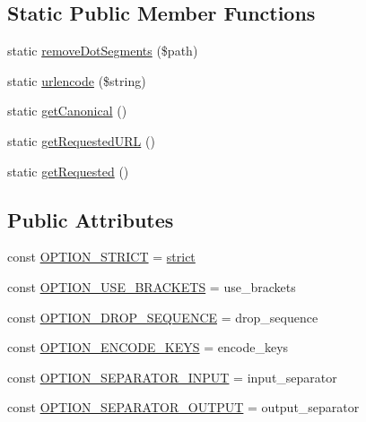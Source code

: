 \subsection*{Static Public Member Functions}
\begin{DoxyCompactItemize}
\item 
static \hyperlink{classNet__URL2_aa2ca379f950f6e7a3932121ad39c0e5a}{remove\+Dot\+Segments} (\$path)
\item 
static \hyperlink{classNet__URL2_ab870de85228bfe185ce8a208c0438c43}{urlencode} (\$string)
\item 
static \hyperlink{classNet__URL2_ae11b6a2c904b4d60e63d75a1bfe508a9}{get\+Canonical} ()
\item 
static \hyperlink{classNet__URL2_acc74a73bb075b3a500ded81b63799d59}{get\+Requested\+U\+RL} ()
\item 
static \hyperlink{classNet__URL2_a57c171f9507f78aafbaba695f1220273}{get\+Requested} ()
\end{DoxyCompactItemize}
\subsection*{Public Attributes}
\begin{DoxyCompactItemize}
\item 
const \hyperlink{classNet__URL2_a766955033bdccec7175d0694df62a1a9}{O\+P\+T\+I\+O\+N\+\_\+\+S\+T\+R\+I\+CT} = \textquotesingle{}\hyperlink{menu_2tpl_2js_2jquery_8jstree_8js_ae2475e10618961c050dcba04e8c42331}{strict}\textquotesingle{}
\item 
const \hyperlink{classNet__URL2_a864182f067e5df22055afc3a0dfe5a57}{O\+P\+T\+I\+O\+N\+\_\+\+U\+S\+E\+\_\+\+B\+R\+A\+C\+K\+E\+TS} = \textquotesingle{}use\+\_\+brackets\textquotesingle{}
\item 
const \hyperlink{classNet__URL2_af415684f1d85246c1132203142b86499}{O\+P\+T\+I\+O\+N\+\_\+\+D\+R\+O\+P\+\_\+\+S\+E\+Q\+U\+E\+N\+CE} = \textquotesingle{}drop\+\_\+sequence\textquotesingle{}
\item 
const \hyperlink{classNet__URL2_ae06ebc991de4ffe92644c5a8d37ad5ac}{O\+P\+T\+I\+O\+N\+\_\+\+E\+N\+C\+O\+D\+E\+\_\+\+K\+E\+YS} = \textquotesingle{}encode\+\_\+keys\textquotesingle{}
\item 
const \hyperlink{classNet__URL2_af5b6f766fae9600b3938e33c32893bce}{O\+P\+T\+I\+O\+N\+\_\+\+S\+E\+P\+A\+R\+A\+T\+O\+R\+\_\+\+I\+N\+P\+UT} = \textquotesingle{}input\+\_\+separator\textquotesingle{}
\item 
const \hyperlink{classNet__URL2_a84719f522747f51638a9c8474d4abc39}{O\+P\+T\+I\+O\+N\+\_\+\+S\+E\+P\+A\+R\+A\+T\+O\+R\+\_\+\+O\+U\+T\+P\+UT} = \textquotesingle{}output\+\_\+separator\textquotesingle{}
\end{DoxyCompactItemize}

